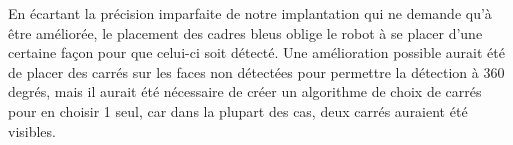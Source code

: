 En écartant la précision imparfaite de notre implantation qui ne demande qu'à être améliorée, le placement des cadres bleus oblige le robot à se placer d'une certaine façon pour que celui-ci soit détecté. Une amélioration possible aurait été de placer des carrés sur les faces non détectées pour permettre la détection à 360 degrés, mais il aurait été nécessaire de créer un algorithme de choix de carrés pour en choisir 1 seul, car dans la plupart des cas, deux carrés auraient été visibles.

